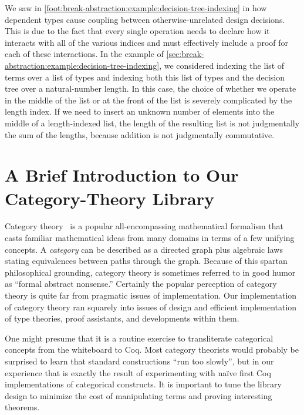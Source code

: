 We saw in \autoref{foot:break-abstraction:example:decision-tree-indexing} in  how dependent types cause coupling between otherwise-unrelated design decisions.
This is due to the fact that every single operation needs to declare how it interacts with all of the various indices and must effectively include a proof for each of these interactions.
In the example of \autoref{sec:break-abstraction:example:decision-tree-indexing}, we considered indexing the list of terms over a list of types and indexing both this list of types and the decision tree over a natural-number length.
In this case, the choice of whether we operate in the middle of the list or at the front of the list is severely complicated by the length index.
If we need to insert an unknown number of elements into the middle of a length-indexed list, the length of the resulting list is not judgmentally the sum of the lengths, because addition is not judgmentally commutative.

\section{A Brief Introduction to Our Category-Theory Library}\label{sec:category-theory-library}
Category theory~\cite{mac1998categories} is a popular all-encompassing mathematical formalism that casts familiar mathematical ideas from many domains in terms of a few unifying concepts.
A \emph{category} can be described as a directed graph plus algebraic laws stating equivalences between paths through the graph.
Because of this spartan philosophical grounding, category theory is sometimes referred to in good humor as ``formal abstract nonsense.''
Certainly the popular perception of category theory is quite far from pragmatic issues of implementation.
Our implementation of category theory ran squarely into issues of design and efficient implementation of type theories, proof assistants, and developments within them.

One might presume that it is a routine exercise to transliterate categorical concepts from the whiteboard to Coq.
Most category theorists would probably be surprised to learn that standard constructions ``run too slowly'', but in our experience that is exactly the result of experimenting with naïve first Coq implementations of categorical constructs.
It is important to tune the library design to minimize the cost of manipulating terms and proving interesting theorems.


